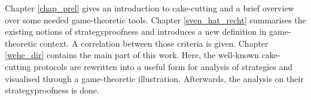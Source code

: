 \newline
Chapter \ref{chap_prel} gives an introduction to cake-cutting and a brief overview over some needed game-theoretic tools. Chapter \ref{sven_hat_recht} summarises the existing notions of strategyproofness and introduces a new definition in game-theoretic context. A correlation between those criteria is given. Chapter \ref{wehe_dir} contains the main part of this work. Here, the well-known cake-cutting protocols are rewritten into a useful form for analysis of strategies and visualised through a game-theoretic illustration. Afterwards, the analysis on their strategyproofness is done.


